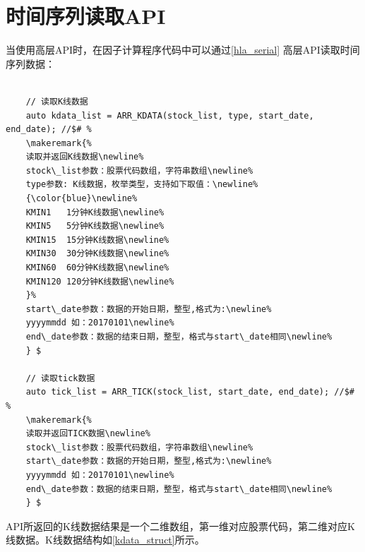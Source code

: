 \section{时间序列读取API}
当使用高层API时，在因子计算程序代码中可以通过\ref{hla_serial} 高层API读取时间序列数据：
\begin{lstlisting}[label={hla_serial},caption=高层API接口, morekeywords={vector,string,config_open,get_array_float64,get_int}]

    // 读取K线数据
    auto kdata_list = ARR_KDATA(stock_list, type, start_date, end_date); //$# %
    \makeremark{%
    读取并返回K线数据\newline%
    stock\_list参数：股票代码数组，字符串数组\newline%
    type参数: K线数据，枚举类型，支持如下取值：\newline%
    {\color{blue}\newline%
    KMIN1   1分钟K线数据\newline%
    KMIN5   5分钟K线数据\newline%
    KMIN15  15分钟K线数据\newline%
    KMIN30  30分钟K线数据\newline%
    KMIN60  60分钟K线数据\newline%
    KMIN120 120分钟K线数据\newline%
    }%
    start\_date参数：数据的开始日期，整型,格式为:\newline%
    yyyymmdd 如：20170101\newline%
    end\_date参数：数据的结束日期，整型，格式与start\_date相同\newline%
    } $

    // 读取tick数据
    auto tick_list = ARR_TICK(stock_list, start_date, end_date); //$# %
    \makeremark{%
    读取并返回TICK数据\newline%
    stock\_list参数：股票代码数组，字符串数组\newline%
    start\_date参数：数据的开始日期，整型,格式为:\newline%
    yyyymmdd 如：20170101\newline%
    end\_date参数：数据的结束日期，整型，格式与start\_date相同\newline%
    } $

\end{lstlisting}
\showremarks\hspace*{0mm}

API所返回的K线数据结果是一个二维数组，第一维对应股票代码，第二维对应K线数据。K线数据结构如\ref{kdata_struct}所示。

